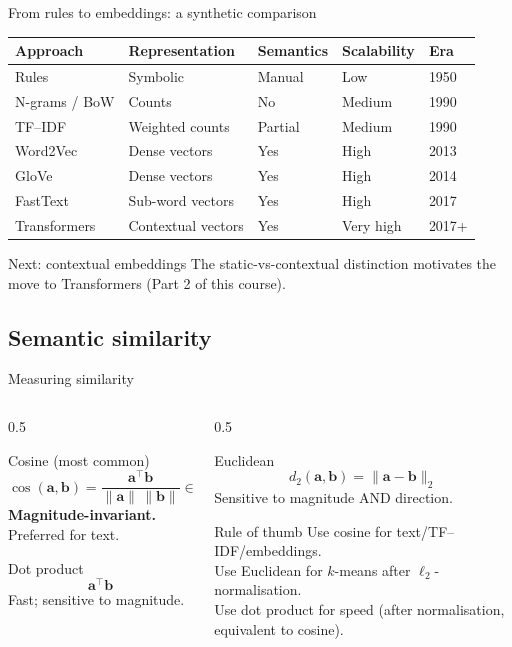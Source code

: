 \documentclass[11pt,aspectratio=169]{beamer}
\begin{document}
\begin{frame}{From rules to embeddings: a synthetic comparison}
\begin{center}
\small
\begin{tabular}{|l|l|l|l|l|}
\hline
\textbf{Approach} & \textbf{Representation} & \textbf{Semantics} & \textbf{Scalability} & \textbf{Era} \\
\hline
Rules & Symbolic & Manual & Low & 1950 \\
N-grams / BoW & Counts & No & Medium & 1990 \\
TF--IDF & Weighted counts & Partial & Medium & 1990 \\
Word2Vec & Dense vectors & Yes & High & 2013 \\
GloVe & Dense vectors & Yes & High & 2014 \\
FastText & Sub-word vectors & Yes & High & 2017 \\
Transformers & Contextual vectors & Yes & Very high & 2017+ \\
\hline
\end{tabular}
\end{center}
\vfill
\begin{block}{Next: contextual embeddings}
The static-vs-contextual distinction motivates the move to Transformers (Part 2 of this course).
\end{block}
\end{frame}

\subsection{Semantic similarity}

\begin{frame}{Measuring similarity}
\begin{columns}[T]
\begin{column}{0.5\textwidth}
\begin{block}{Cosine (most common)}
\[ \cos(\mathbf{a}, \mathbf{b}) = \frac{\mathbf{a}^\top \mathbf{b}}{\|\mathbf{a}\|\, \|\mathbf{b}\|} \in [-1, 1] \]
\textbf{Magnitude-invariant.} Preferred for text.
\end{block}
\begin{block}{Dot product}
\[ \mathbf{a}^\top \mathbf{b} \]
Fast; sensitive to magnitude.
\end{block}
\end{column}
\begin{column}{0.5\textwidth}
\begin{block}{Euclidean}
\[ d_2(\mathbf{a}, \mathbf{b}) = \|\mathbf{a} - \mathbf{b}\|_2 \]
Sensitive to magnitude AND direction.
\end{block}
\begin{exampleblock}{Rule of thumb}
Use cosine for text/TF--IDF/embeddings.\\
Use Euclidean for $k$-means after $\ell_2$-normalisation.\\
Use dot product for speed (after normalisation, equivalent to cosine).
\end{exampleblock}
\end{column}
\end{columns}
\end{frame}
\end{document}
